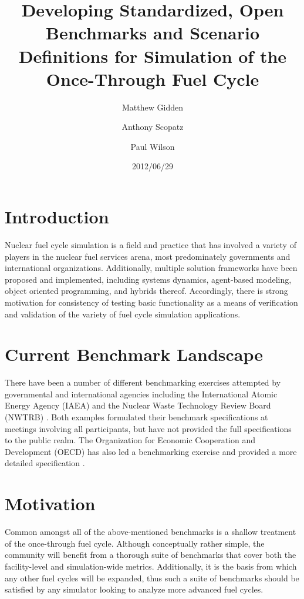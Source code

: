 \documentclass{anstrans}
\title{Developing Standardized, Open Benchmarks and Scenario 
Definitions for Simulation of the Once-Through Fuel Cycle}
\author[*]{Matthew Gidden}
\author[$\dag$]{Anthony Scopatz}
\author[*]{Paul Wilson}
\affil[*]{Department of Nuclear Engineering \& Engineering Physics, 
University of Wisconsin - Madison, Madison, WI, 53703}
\affil[$\dag$]{The Flash Center for Computational Science, University 
of Chicago, Chicago, IL, 60637}
\date{2012/06/29}
\begin{document}
\section{Introduction}
Nuclear fuel cycle simulation is a field and practice that has 
involved a variety of players in the nuclear fuel services arena, most
predominately governments and international organizations. 
Additionally, multiple solution frameworks have been proposed and 
implemented, including systems dynamics, agent-based modeling, object 
oriented programming, and hybrids thereof. Accordingly, there is 
strong motivation for consistency of testing basic functionality as a
means of verification and validation of the variety of fuel cycle
simulation applications.

\section{Current Benchmark Landscape}
There have been a number of different benchmarking exercises attempted
by governmental and international agencies including the International
Atomic Energy Agency (IAEA) \cite{_international_2011} and the
Nuclear Waste Technology Review Board (NWTRB) \cite{_nuclear_2011}.
Both examples formulated their benchmark specifications at meetings
involving all participants, but have not provided the full 
specifications to the public realm. The Organization for Economic 
Cooperation and Development (OECD) has also led a benchmarking 
exercise \cite{boucher_benchmark_2012} and provided a more detailed
specification \cite{boucher_specification_2008}.

\section{Motivation}
Common amongst all of the above-mentioned benchmarks is a shallow
treatment of the once-through fuel cycle. Although conceptually 
rather simple, the community will benefit from a thorough suite of 
benchmarks that cover both the facility-level and simulation-wide 
metrics. Additionally, it is the basis from which any other fuel 
cycles will be expanded, thus such a suite of benchmarks should be 
satisfied by any simulator looking to analyze more advanced fuel 
cycles.
\end{document}
